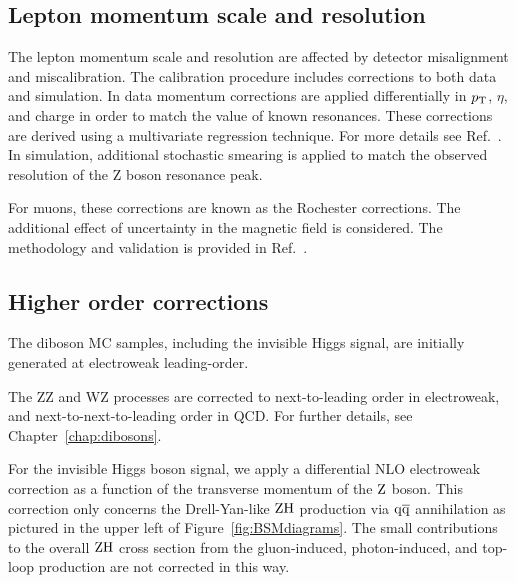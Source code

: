 \subsection{Lepton momentum scale and resolution}
\label{subsec:lepres}
The lepton momentum scale and resolution are affected by detector misalignment 
and miscalibration. The calibration procedure includes corrections to both 
data and simulation.
In data momentum corrections are applied differentially in $p_{\mathrm{T}}$, $\eta$, and charge in order to match the value of known resonances. 
These corrections are derived using a multivariate regression technique.
For more details see Ref.~\cite{Chatrchyan:2013dga}. 
In simulation, additional stochastic smearing is applied to match the observed
resolution of the Z boson resonance peak.

For muons, these corrections are known as the Rochester corrections.
The additional effect of uncertainty in the magnetic field is considered.
The methodology and validation is provided in Ref.~\cite{Bodek:2012id}.

\subsection{Higher order corrections}
\label{sec:higher-order-corrections}
The diboson MC samples, including the invisible Higgs signal, are initially generated at electroweak leading-order.

The ZZ and WZ processes are corrected to next-to-leading order in electroweak,
and next-to-next-to-leading order in QCD.
For further details, see Chapter~\ref{chap:dibosons}. 


For the invisible Higgs boson signal, we apply a differential NLO electroweak correction as a function of the transverse momentum of the $\mathrm{Z}$ boson.
This correction only concerns the Drell-Yan-like $\mathrm{Z}\mathrm{H}$ production via $\mathrm{q}\mathrm{\overline{q}}$ annihilation
as pictured in the upper left of Figure~\ref{fig:BSMdiagrams}.
The small contributions to the overall $\mathrm{Z}\mathrm{H}$ cross section from the gluon-induced, photon-induced, and top-loop production are not corrected in this way.

